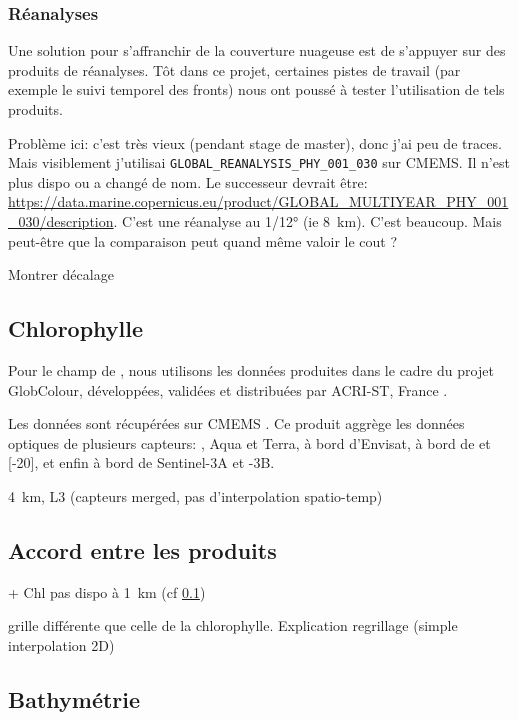 \documentclass[index]{subfiles}
\begin{document}
\subsubsection{Réanalyses}
\label{sec:donnees-sst-reanalyses}

Une solution pour s'affranchir de la couverture nuageuse est de s'appuyer sur des produits de réanalyses.
Tôt dans ce projet, certaines pistes de travail (par exemple le suivi temporel des fronts) nous ont poussé à tester l'utilisation de tels produits.

Problème ici: c'est très vieux (pendant stage de master), donc j'ai peu de traces.
Mais visiblement j'utilisai \verb|GLOBAL_REANALYSIS_PHY_001_030| sur CMEMS\@.
Il n'est plus dispo ou a changé de nom. Le successeur devrait être: \url{https://data.marine.copernicus.eu/product/GLOBAL_MULTIYEAR_PHY_001_030/description}.
C'est une réanalyse au 1/12° (ie 8~km). C'est beaucoup.
Mais peut-être que la comparaison peut quand même valoir le cout ?

Montrer décalage

\subsection{Chlorophylle}
\label{sec:donnees-chl}

Pour le champ de , nous utilisons les données produites dans le cadre du projet GlobColour, développées, validées et distribuées par ACRI-ST, France \parencite{maritorena_2002}.

Les données sont récupérées sur \gls{CMEMS} \parencite{chl-globcolour}.
Ce produit aggrège les données optiques de plusieurs capteurs: ,  Aqua et Terra,  à bord d'Envisat,  à bord de  et [-20], et enfin  à bord de Sentinel-3A et -3B.

4~km, L3 (capteurs merged, pas d'interpolation spatio-temp)

\subsection{Accord entre les produits}

+ Chl pas dispo à 1~km
(cf \cref{sec:donnees-chl})

grille différente que celle de la chlorophylle.
Explication regrillage (simple interpolation 2D)

\subsection{Bathymétrie}
\label{sec:donnees-bathymetrie}
\end{document}
